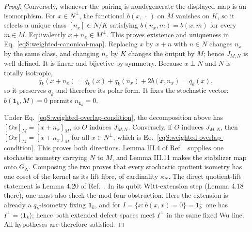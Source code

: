 \documentclass[journal,twocolumn]{IEEEtran}
\theoremstyle{definition}
\theoremstyle{plain}
\newcommand{\one}{\bm 1}
\begin{document}
\begin{proof}
Conversely, whenever the pairing is nondegenerate the displayed map is an
isomorphism.  For $x\in N^\perp$, the functional
$b(x,\,\cdot\,)$ on $M$ vanishes on $K$, so it selects a unique class
$[n_x]\in N/K$ satisfying $b(n_x,m)=b(x,m)$ for every $m\in M$.
Equivalently $x+n_x\in M^\perp$.  This proves existence and uniqueness in
Eq.~\eqref{eqS:weighted-canonical-map}.  Replacing $x$ by $x+n$ with
$n\in N$ changes $n_x$ by the same class, and changing $n_x$ by $K$
changes the output by $M$; hence $J_{M,N}$ is well defined.  It is linear
and bijective by symmetry.  Because $x\perp N$ and $N$ is totally
isotropic,
\begin{equation}
 q_k(x+n_x)=q_k(x)+q_k(n_x)+2b(x,n_x)=q_k(x),
\end{equation}
so it preserves $q_k$ and therefore its polar form.  It fixes the
stochastic vector: $b(\one_k,M)=0$ permits $n_{\one_k}=0$.

Under Eq.~\eqref{eqS:weighted-overlap-condition}, the decomposition above
has $[Ox]_M=[x+n_x]_M$, so $O$ induces $J_{M,N}$.  Conversely, if $O$
induces $J_{M,N}$, then
$[Ox]_M=[x+n_x]_M$ for all $x\in N^\perp$, which is
Eq.~\eqref{eqS:weighted-overlap-condition}.  This proves both directions.
Lemma III.4 of
Ref.~\cite{MontealegreGross2025} supplies one stochastic isometry carrying
$N$ to $M$, and Lemma III.11 makes the stabilizer map onto $G_N$.
Composing the two proves that every stochastic quotient isometry has one
coset of the kernel as its lift fibre, of cardinality $\kappa_N$.  The
direct quotient-lift statement is Lemma 4.20 of
Ref.~\cite{GrossNezamiWalter2021}.  In its qubit Witt-extension step
(Lemma 4.18 there), one must also check the mod-four obstruction.  Here the
extension is already a $q_k$-isometry fixing $\one_k$, and for
$I=\{x:b(x,x)=0\}=\one_k^\perp$ one has
$I^\perp=\langle\one_k\rangle$; hence both extended defect spaces meet
$I^\perp$ in the same fixed Wu line.  All hypotheses are therefore
satisfied.


\end{proof}
\end{document}
